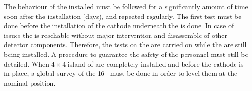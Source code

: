 The  behaviour of the installed  must be followed for a significantly amount of time soon after the installation (days), and repeated regularly.
The first test must be done before the installation of the cathode underneath the  is done: In case of issues the  is reachable without major intervention and disassemble of other detector components.
Therefore, the  tests on the  are carried on while the  are still being installed.
A procedure to guarantee the safety of the personnel must still be detailed.
When $4 \times 4$ island of  are completely installed and before the cathode is in place, a global survey of the 16~ must be done in order to level them at the nominal position.



